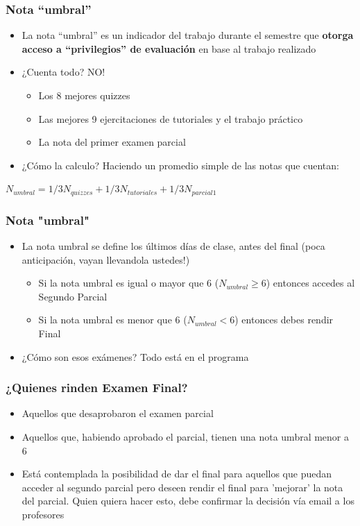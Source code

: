 \documentclass{beamer}
\begin{document}
\begin{frame}
\frametitle{Nota ``umbral''}
\begin{itemize}
    \item La nota ``umbral'' es un indicador del trabajo durante el semestre que \textbf{otorga acceso a ``privilegios'' de evaluación} en base al trabajo realizado
    \item ¿Cuenta todo? NO!
        \begin{itemize}
            \item Los 8 mejores quizzes
            \item Las mejores 9 ejercitaciones de tutoriales y el trabajo práctico
            \item La nota del primer examen parcial
        \end{itemize}
    \item ¿Cómo la calculo? Haciendo un promedio simple de las notas que cuentan:
    \end{itemize}
    
\begin{center}
 $N_{umbral}=1/3N_{quizzes}+1/3N_{tutoriales}+1/3N_{parcial 1}$   
 
\end{center}    
\end{frame}

\begin{frame}
\frametitle{Nota "umbral"}
\begin{itemize}
    \item La nota umbral se define los últimos días de clase, antes del final (poca anticipación, vayan llevandola ustedes!)      
    \begin{itemize}
        \item Si la nota umbral es igual o mayor que 6 ($N_{umbral} \geq 6$) entonces accedes al Segundo Parcial
        \item Si la nota umbral es menor que 6 ($N_{umbral} < 6$) entonces debes rendir Final
    \end{itemize}       
    \item ¿Cómo son esos exámenes? Todo está en el programa 
\end{itemize}
\end{frame}

\begin{frame}
\frametitle{¿Quienes rinden Examen Final?}
\begin{itemize}
    \item Aquellos que desaprobaron el examen parcial
    \item Aquellos que, habiendo aprobado el parcial, tienen una nota umbral menor a 6
    \item Está contemplada la posibilidad de dar el final para aquellos que puedan acceder al segundo parcial pero deseen rendir el final para 'mejorar' la nota del parcial. Quien quiera hacer esto, debe confirmar la decisión vía email a los profesores
\end{itemize}
\end{frame}
\end{document}
